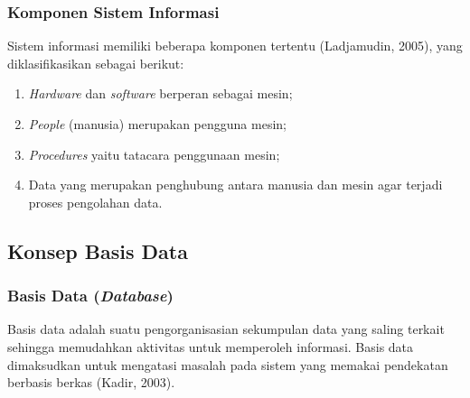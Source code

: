     \subsubsection{Komponen Sistem Informasi}
    Sistem informasi memiliki beberapa komponen tertentu (Ladjamudin, 2005), yang diklasifikasikan sebagai berikut:
        \begin{enumerate}
            \itemsep0em
            \item \emph{Hardware} dan \emph{software} berperan sebagai mesin;
            \item \emph{People} (manusia) merupakan pengguna mesin;
            \item \emph{Procedures} yaitu tatacara penggunaan mesin;
            \item Data yang merupakan penghubung antara manusia dan mesin agar terjadi proses pengolahan data.
        \end{enumerate}

\subsection{Konsep Basis Data}

    \subsubsection{Basis Data (\emph{Database})}
    Basis data adalah suatu pengorganisasian sekumpulan data yang saling terkait sehingga memudahkan aktivitas untuk memperoleh informasi. Basis data dimaksudkan untuk mengatasi masalah pada sistem yang memakai pendekatan berbasis berkas (Kadir, 2003).

